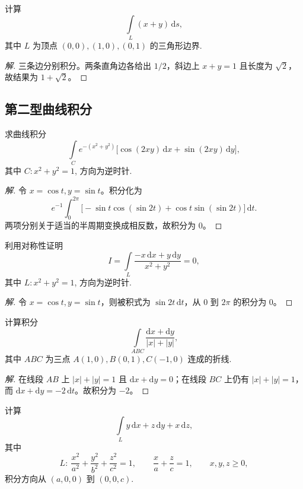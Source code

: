 \documentclass[../../数学分析培优讲义(答案版).tex]{subfiles}
\begin{document}
\begin{example}
计算
\[
    \int\limits_L(x+y)\,\mathrm{d}s,
\]
其中 $L$ 为顶点 $(0,0),(1,0),(0,1)$ 的三角形边界.
\end{example}

\begin{proof}[解]
三条边分别积分。两条直角边各给出 $1/2$，斜边上 $x+y=1$ 且长度为 $\sqrt{2}$，故结果为 $1+\sqrt{2}$。
\end{proof}

\subsection{第二型曲线积分}

\begin{example}
求曲线积分
\[
    \int\limits_C e^{-(x^2+y^2)}\bigl\lbrack \cos(2xy)\,\mathrm{d}x+\sin(2xy)\,\mathrm{d}y\bigr\rbrack,
\]
其中 $C:x^2+y^2=1$, 方向为逆时针.
\end{example}

\begin{proof}[解]
令 $x=\cos t,y=\sin t$。积分化为
\[
e^{-1}\int_0^{2\pi}\bigl[-\sin t\cos(\sin2t)+\cos t\sin(\sin2t)\bigr]\,\mathrm{d}t.
\]
两项分别关于适当的半周期变换成相反数，故积分为 $0$。
\end{proof}

\begin{example}
利用对称性证明
\[
    I=\int\limits_L\dfrac{-x\,\mathrm{d}x+y\,\mathrm{d}y}{x^2+y^2}=0,
\]
其中 $L:x^2+y^2=1$, 方向为逆时针.
\end{example}

\begin{proof}[解]
令 $x=\cos t,y=\sin t$，则被积式为 $\sin2t\,\mathrm{d}t$，从 $0$ 到 $2\pi$ 的积分为 $0$。
\end{proof}

\begin{example}
计算积分
\[
    \int\limits_{ABC}\dfrac{\mathrm{d}x+\mathrm{d}y}{|x|+|y|},
\]
其中 $ABC$ 为三点 $A(1,0),B(0,1),C(-1,0)$ 连成的折线.
\end{example}

\begin{proof}[解]
在线段 $AB$ 上 $|x|+|y|=1$ 且 $\mathrm{d}x+\mathrm{d}y=0$；在线段 $BC$ 上仍有 $|x|+|y|=1$，而 $\mathrm{d}x+\mathrm{d}y=-2\,\mathrm{d}t$。故积分为 $-2$。
\end{proof}

\begin{example}
计算
\[
    \int\limits_L y\,\mathrm{d}x+z\,\mathrm{d}y+x\,\mathrm{d}z,
\]
其中
\[
    L:\ \dfrac{x^2}{a^2}+\dfrac{y^2}{b^2}+\dfrac{z^2}{c^2}=1,
    \qquad \dfrac{x}{a}+\dfrac{z}{c}=1,
    \qquad x,y,z\geq0,
\]
积分方向从 $(a,0,0)$ 到 $(0,0,c)$.
\end{example}
\end{document}
